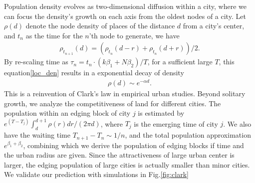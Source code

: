 \documentclass[reprint,unsortedaddress,amsmath,amssymb,aps,prl,showkeys]{revtex4-2}
\begin{document}

Population density evolves as two-dimensional diffusion within a city\cite{doi:10.1137/0150099}, where we can focus the density's growth on each axis from the oldest nodes of a city. Let $\rho(d)$ denote the node density of places of the distance $d$ from a city's center, and $t_n$ as the time for the $n$'th node to generate, we have 
\begin{align}
    \rho_{t_{n+1}}(d) = (\rho_{t_{n}}(d-r) + \rho_{t_{n}}(d+r) )/2.\label{loc_den}  
\end{align} By re-scaling time as $\tau_n = t_n\cdot (k\beta_1+N\beta_2)/T$, for a sufficient large $T$, this equation\@s\ref{loc_den} results in a exponential decay of density
    \begin{align}
        \rho(d)\sim e^{-\alpha d}\label{clark_eq}.
    \end{align}
This is a reinvention of Clark's law in empirical urban studies\cite{clark1951urban}. Beyond solitary growth, we analyze the competitiveness of land for different cities. The population within an edging block of city $j$ is estimated by $e^{(T-T_j)}\int_{d}^{d+1}\rho(r)dr/(2\pi d)$, where $T_j$ is the emerging time of city $j$. We also have the waiting time $T_{n+1}-T_{n}\sim 1/n$, and the total population approximation $e^{\beta_1+\beta_2}$, combining which we derive the population of edging blocks if time and the urban radius are given. Since the attractiveness of large urban center is larger, the edging population of large cities is actually smaller than minor cities. We validate our prediction with simulations in Fig.\@\ref{fig:clark} %

\end{document}

